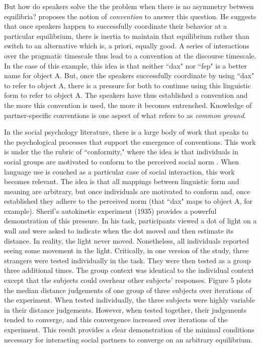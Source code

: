 \documentclass[man, noapacite, 12pt]{apa2}
\begin{document}
But how do speakers solve the the problem when there is no asymmetry between equilibria?  proposes the notion of {\it convention} to answer this question. He suggests that once speakers happen to successfully coordinate their behavior at a particular equilibrium, there is inertia to maintain that equilibrium rather than switch to an alternative which is, a priori, equally good. A series of  interactions over the pragmatic timescale thus lead to a convention at the discourse timescale. In the case of this example, this idea is that neither ``dax" nor ``fep" is a better name for object A. But, once the speakers successfully coordinate by using ``dax" to refer to object A, there is a pressure for both to continue using this linguistic form to refer to object A. The speakers have thus established a convention and the more this convention is used, the more  it becomes entrenched. Knowledge of partner-specific conventions is one aspect of what  refers to as {\it common ground}.

In the social psychology literature, there is a large body of work that speaks to the psychological processes that support the emergence of conventions. This work is under the the rubric of ``conformity," where the idea is that individuals in social groups are motivated to conform to the perceived social norm  \cite{cialdini2004social}. When language use is couched as a particular case of social interaction, this work becomes relevant. The idea is that all mappings between linguistic form and meaning are arbitrary, but once individuals are motivated to conform and, once established they adhere to the perceived norm (that ``dax" maps to object A, for example).  Sherif's autokinetic experiment (1935)\nocite{sherif1935} provides a powerful demonstration of this pressure. In his task, participants viewed a dot of light on a wall and were asked to indicate when the dot moved and then estimate its distance. In reality, the light never moved. Nonetheless, all individuals reported seeing some movement in the light. Critically, in one version of the study, three strangers  were tested individually in the task. They were then tested as a group three additional times. The group context was identical to the individual context except that the subjects could overhear other subjects' responses. Figure 5 plots the median distance judgements of one group of three subjects over iterations of the experiment. When tested individually, the three subjects were highly variable in their distance judgements. However, when tested together, their judgements tended to converge, and this convergence increased over iterations of the experiment. This result provides a clear demonstration of the minimal conditions necessary for interacting social partners to converge on an arbitrary equilibrium. 
\end{document}
